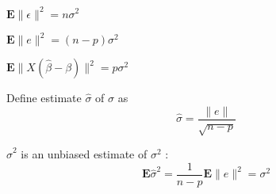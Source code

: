 
\begin{theorem}
    $ \mathbf{E}\|\epsilon\|^{2}=n \sigma^{2} $
\end{theorem}

\begin{theorem}
    $ \mathbf{E}\|e\|^{2}=(n-p) \sigma^{2} $
\end{theorem}

\begin{theorem}
    $ \mathbf{E}\|X(\hat{\beta}-\beta)\|^{2}=p \sigma^{2} $
\end{theorem}

\begin{definition}
    Define estimate $ \hat{\sigma} $ of $ \sigma $ as
$$
\hat{\sigma}=\frac{\|e\|}{\sqrt{n-p}}
$$
\end{definition}

\begin{theorem}
    $ \hat{\sigma}^{2} $ is an unbiased estimate of $ \sigma^{2} $ :
$$
\mathbf{E} \hat{\sigma}^{2}=\frac{1}{n-p} \mathbf{E}\|e\|^{2}=\sigma^{2}
$$
\end{theorem}


